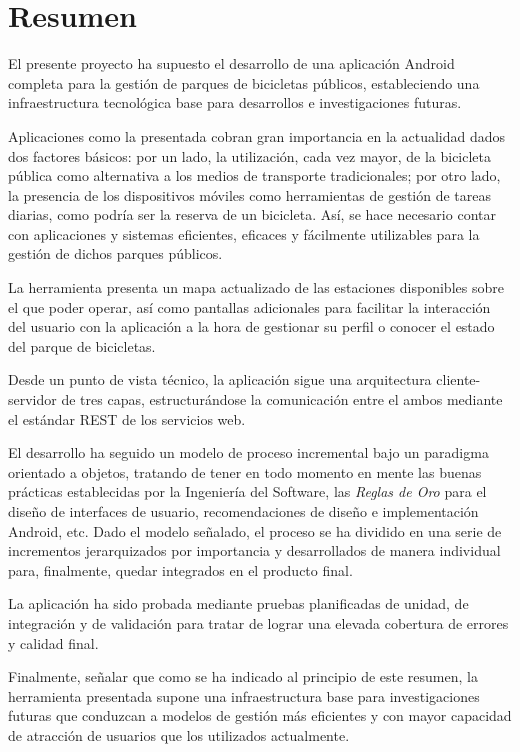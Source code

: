 
\chapter{Resumen}


El presente proyecto ha supuesto el desarrollo de una aplicación Android completa para la gestión de parques de bicicletas públicos, estableciendo una infraestructura tecnológica base para desarrollos e investigaciones futuras. 

Aplicaciones como la presentada cobran gran importancia en la actualidad dados dos factores básicos: por un lado, la utilización, cada vez mayor, de la bicicleta pública como alternativa a los medios de transporte tradicionales; por otro lado, la presencia de los dispositivos móviles como herramientas de gestión de tareas diarias, como podría ser la reserva de un bicicleta. Así, se hace necesario contar con aplicaciones y sistemas eficientes, eficaces y fácilmente utilizables para la gestión de dichos parques públicos.

La herramienta presenta un mapa actualizado de las estaciones disponibles sobre el que poder operar, así como pantallas adicionales para facilitar la interacción del usuario con la aplicación a la hora de gestionar su perfil o conocer el estado del parque de bicicletas.

Desde un punto de vista técnico, la aplicación sigue una arquitectura cliente-servidor de tres capas, estructurándose la comunicación entre el ambos mediante el estándar \textsc{REST} de los servicios web. 

El desarrollo ha seguido un modelo de proceso incremental bajo un paradigma orientado a objetos, tratando de tener en todo momento en mente las buenas prácticas establecidas por la Ingeniería del Software, las \emph{Reglas de Oro} para el diseño de interfaces de usuario, recomendaciones de diseño e implementación Android, etc. Dado el modelo señalado, el proceso se ha dividido en una serie de incrementos jerarquizados por importancia y desarrollados de manera individual para, finalmente, quedar integrados en el producto final.

La aplicación ha sido probada mediante pruebas planificadas de unidad, de integración y de validación para tratar de lograr una elevada cobertura de errores y calidad final.

Finalmente, señalar que como se ha indicado al principio de este resumen, la herramienta presentada supone una infraestructura base para investigaciones futuras que conduzcan a modelos de gestión más eficientes y con mayor capacidad de atracción de usuarios que los utilizados actualmente.




